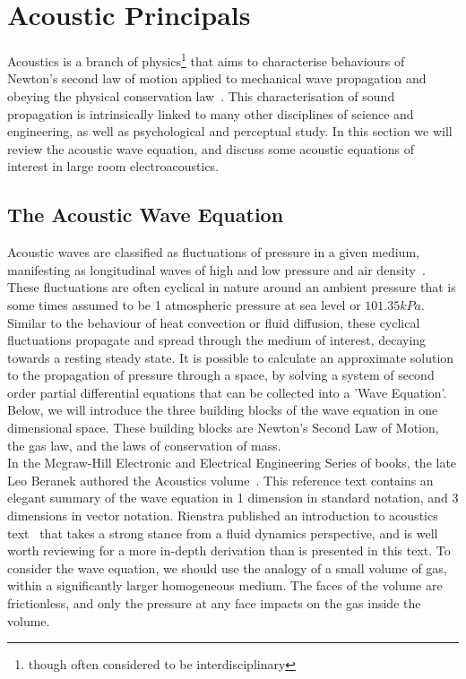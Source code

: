 %
%
%
\chapter{Acoustic Principals}
\label{Introduction}
Acoustics is a branch of physics\footnote{though often considered to be interdisciplinary} that aims to characterise behaviours of Newton's second law of motion applied to mechanical wave propagation and obeying the physical conservation law~\cite{beranek1954acoustics}. This characterisation of sound propagation is intrinsically linked to many other disciplines of science and engineering, as well as psychological and perceptual study. In this section we will review the acoustic wave equation, and discuss some acoustic equations of interest in large room electroacoustics.

\section{The Acoustic Wave Equation}

Acoustic waves are classified as fluctuations of pressure in a given medium, manifesting as longitudinal waves of high and low pressure and air density~\cite{Rossing2007}. These fluctuations are often cyclical in nature around an ambient pressure that is some times assumed to be 1 atmospheric pressure at sea level or $101.35kPa$. Similar to the behaviour of heat convection or fluid diffusion, these cyclical fluctuations propagate and spread through the medium of interest, decaying towards a resting steady state. It is possible to calculate an approximate solution to the propagation of pressure through a space, by solving a system of second order partial differential equations that can be collected into a 'Wave Equation'. Below, we will introduce the three building blocks of the wave equation in one dimensional space. These building blocks are Newton's Second Law of Motion, the gas law, and the laws of conservation of mass.\\

In the Mcgraw-Hill Electronic and Electrical Engineering Series of books, the late Leo Beranek authored the Acoustics volume~\cite{beranek1954acoustics}. This reference text contains an elegant summary of the wave equation in 1 dimension in standard notation, and 3 dimensions in vector notation. Rienstra published an introduction to acoustics text~\cite{Rienstra1952} that takes a strong stance from a fluid dynamics perspective, and is well worth reviewing for a more in-depth derivation than is presented in this text. To consider the wave equation, we should use the analogy of a small volume of gas, within a significantly larger homogeneous medium. The faces of the volume are frictionless, and only the pressure at any face impacts on the gas inside the volume.\\

